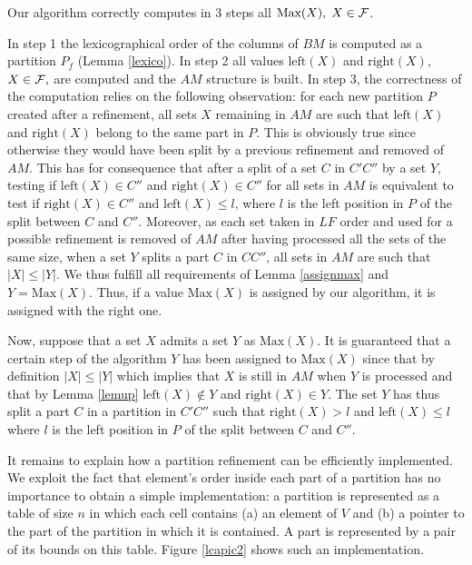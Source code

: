 \documentclass{llncs}
\begin{document}
\begin{lemma}
Our algorithm correctly computes in 3 steps all $\mbox{Max}(X), \; X
\in {\cal F}$.
\label{correctness}
\end{lemma}
\begin{preuve}
In step 1 the lexicographical order of the columns of $BM$ is computed
as a partition $P_f$ (Lemma \ref{lexico}). In step 2 all values
$\mbox{left}(X)$ and $\mbox{right}(X)$, $X \in {\cal F},$ are computed
and the $AM$ structure is built.  In step 3, the correctness of the
computation relies on the following observation: for each new
partition $P$ created after a refinement, all sets $X$ remaining in
$AM$ are such that $\mbox{left}(X)$ and $\mbox{right}(X)$ belong to
the same part in $P$. This is obviously true since otherwise they would
have been split by a previous refinement and removed of $AM$. This has
for consequence that after a split of a set $C$ in $C'C''$ by a set
$Y$, testing if $\mbox{left}(X) \in C'' $ and $\mbox{right}(X) \in
C''$ for all sets in $AM$ is equivalent to test if $\mbox{right}(X)
\in C''$ and $\mbox{left}(X)\leq l$, where $l$ is the left position in
$P$ of the split between $C$ and $C''$. Moreover, as each set taken in
$LF$ order and used for a possible refinement is removed of $AM$ after
having processed all the sets of the same size, when a set $Y$ splits
a part $C$ in $CC''$, all sets in $AM$ are such that $|X|\leq |Y|$. We
thus fulfill all requirements of Lemma \ref{assignmax} and
$Y=\mbox{Max}(X).$ Thus, if a value $\mbox{Max}(X)$ is assigned by our
algorithm, it is assigned with the right one.

Now, suppose that a set $X$ admits a set $Y$ as $\mbox{Max}(X)$. It is
guaranteed that a certain step of the algorithm $Y$ has been assigned
to $\mbox{Max}(X)$ since that by definition $|X|\leq |Y|$ which
implies that $X$ is still in $AM$ when $Y$ is processed and that by Lemma
\ref{lemup} $\mbox{left}(X)\not\in Y$ and $\mbox{right}(X)\in Y.$ The
set $Y$ has thus split a part $C$ in a partition in $C'C''$ such that
$\mbox{right}(X)>l$ and $\mbox{left}(X)\leq l$ where $l$ is the left
position in $P$ of the split between $C$ and $C''.$
\end{preuve}

\noindent
It remains to explain how a partition refinement can be efficiently
implemented. We exploit the fact that element's order inside each part
of a partition has no importance to obtain a simple implementation: a
partition is represented as a table of size $n$ in which each cell
contains (a) an element of $V$ and (b) a pointer to the part of the
partition in which it is contained. A part is
represented by a pair of its bounds on this table. Figure
\ref{lcapic2} shows such an implementation.
\end{document}
